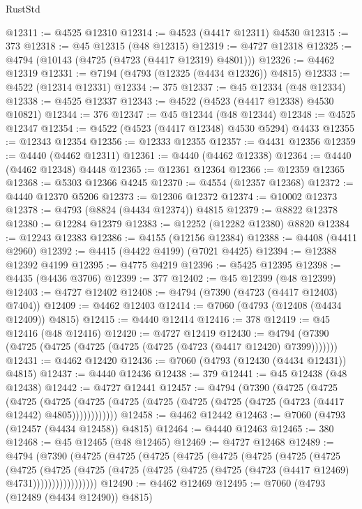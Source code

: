 \begin{lexlean}{RustStd}
\begin{coremodule}
@12311 := @4525 @12310
@12314 := @4523 (@4417 @12311) @4530
@12315 := 373
@12318 := @45 @12315 (@48 @12315)
@12319 := @4727 @12318
@12325 := @4794 (@10143 (@4725 (@4723 (@4417 @12319) @4801)))
@12326 := @4462 @12319
@12331 := @7194 (@4793 (@12325 (@4434 @12326)) @4815)
@12333 := @4522 (@12314 @12331)
@12334 := 375
@12337 := @45 @12334 (@48 @12334)
@12338 := @4525 @12337
@12343 := @4522 (@4523 (@4417 @12338) @4530 @10821)
@12344 := 376
@12347 := @45 @12344 (@48 @12344)
@12348 := @4525 @12347
@12354 := @4522 (@4523 (@4417 @12348) @4530 @5294) @4433
@12355 := @12343 @12354
@12356 := @12333 @12355
@12357 := @4431 @12356
@12359 := @4440 (@4462 @12311)
@12361 := @4440 (@4462 @12338)
@12364 := @4440 (@4462 @12348) @4448
@12365 := @12361 @12364
@12366 := @12359 @12365
@12368 := @5303 @12366 @4245
@12370 := @4554 (@12357 @12368)
@12372 := @4440 @12370 @5206
@12373 := @12306 @12372
@12374 := @10002 @12373
@12378 := @4793 (@8824 (@4434 @12374)) @4815
@12379 := @8822 @12378
@12380 := @12284 @12379
@12383 := @12252 (@12282 @12380) @8820
@12384 := @12243 @12383
@12386 := @4155 (@12156 @12384)
@12388 := @4408 (@4411 @2960)
@12392 := @4415 (@4422 @4199) (@7021 @4425)
@12394 := @12388 @12392 @4199
@12395 := @4775 @4219
@12396 := @5425 @12395
@12398 := @4435 (@4436 @3706)
@12399 := 377
@12402 := @45 @12399 (@48 @12399)
@12403 := @4727 @12402
@12408 := @4794 (@7390 (@4723 (@4417 @12403) @7404))
@12409 := @4462 @12403
@12414 := @7060 (@4793 (@12408 (@4434 @12409)) @4815)
@12415 := @4440 @12414
@12416 := 378
@12419 := @45 @12416 (@48 @12416)
@12420 := @4727 @12419
@12430 := @4794 (@7390 (@4725 (@4725 (@4725 (@4725 (@4725 (@4723 (@4417 @12420) @7399)))))))
@12431 := @4462 @12420
@12436 := @7060 (@4793 (@12430 (@4434 @12431)) @4815)
@12437 := @4440 @12436
@12438 := 379
@12441 := @45 @12438 (@48 @12438)
@12442 := @4727 @12441
@12457 := @4794
    (@7390
      (@4725
        (@4725
          (@4725
            (@4725 (@4725 (@4725 (@4725 (@4725 (@4725 (@4725 (@4723 (@4417 @12442) @4805))))))))))))
@12458 := @4462 @12442
@12463 := @7060 (@4793 (@12457 (@4434 @12458)) @4815)
@12464 := @4440 @12463
@12465 := 380
@12468 := @45 @12465 (@48 @12465)
@12469 := @4727 @12468
@12489 := @4794
    (@7390
      (@4725
        (@4725
          (@4725
            (@4725
              (@4725
                (@4725
                  (@4725
                    (@4725
                      (@4725
                        (@4725
                          (@4725
                            (@4725 (@4725 (@4725 (@4725 (@4723 (@4417 @12469) @4731)))))))))))))))))
@12490 := @4462 @12469
@12495 := @7060 (@4793 (@12489 (@4434 @12490)) @4815)

\end{coremodule}
\end{lexlean}
